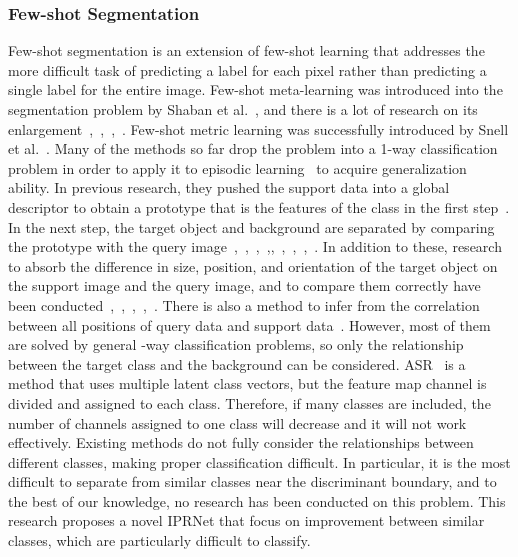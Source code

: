 \documentclass[runningheads]{llncs}
\begin{document}
\subsubsection{Few-shot Segmentation}
Few-shot segmentation is an extension of few-shot learning that addresses the more difficult task of predicting a label for each pixel rather than predicting a single label for the entire image.
Few-shot meta-learning was introduced into the segmentation problem by Shaban et al.~\cite{Oneshot}, and there is a lot of research on its enlargement~\cite{Differentiable},~\cite{Init},~\cite{Without},~\cite{CWT}. 
Few-shot metric learning was successfully introduced by Snell et al.~\cite{Proto_seg}.
Many of the methods so far drop the problem into a 1-way classification problem in order to apply it to episodic learning~\cite{MatchNet} to acquire generalization ability. 
In previous research, they pushed the support data into a global descriptor to obtain a prototype that is the features of the class in the first step~\cite{AMP}. 
In the next step, the target object and background are separated by comparing the prototype with the query image~\cite{FWB},~\cite{CANet},~\cite{PANet},~\cite{PGNet},\cite{PPNet},~\cite{PMMs},~\cite{PFENet},~\cite{ASGNet},~\cite{MLC}.
In addition to these, research to absorb the difference in size, position, and orientation of the target object on the support image and the query image, and to compare them correctly have been conducted~\cite{CRNet},~\cite{FGN},~\cite{SCL},~\cite{DAN},~\cite{SAGNN}.
There is also a method to infer from the correlation between all positions of query data and support data~\cite{HSNet}.
However, most of them are solved by general -way classification problems, so only the relationship between the target class and the background can be considered. ASR~\cite{ASR} is a method that uses multiple latent class vectors, but the feature map channel is divided and assigned to each class.
Therefore, if many classes are included, the number of channels assigned to one class will decrease and it will not work effectively.
Existing methods do not fully consider the relationships between different classes, making proper classification difficult.
In particular, it is the most difficult to separate from similar classes near the discriminant boundary, and  to the best of our knowledge, no research has been conducted on this problem.
This research proposes a novel IPRNet that focus on improvement between similar classes, which are particularly difficult to classify.
\end{document}
